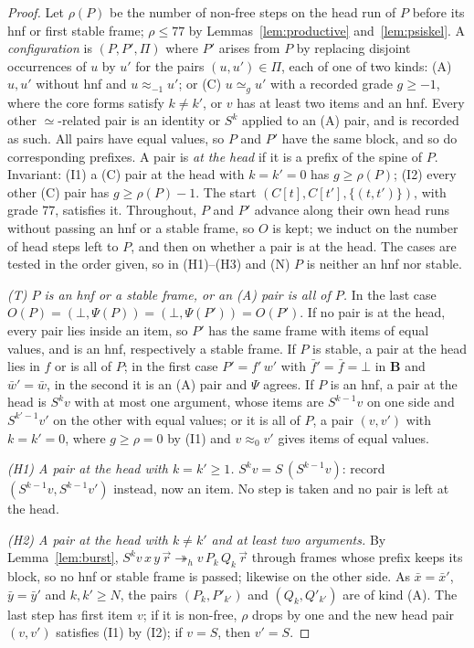 \documentclass[11pt]{amsart}
\theoremstyle{definition}
\newcommand{\B}{\mathbf B}
\newcommand{\hred}{\twoheadrightarrow_h}
\begin{document}
\begin{proof}
Let $\rho(P)$ be the number of non-free steps on the head run of $P$ before its hnf or first stable
frame; $\rho\le77$ by Lemmas~\ref{lem:productive} and~\ref{lem:psiskel}. A \emph{configuration} is
$(P,P',\Pi)$ where $P'$ arises from $P$ by replacing disjoint occurrences of $u$ by $u'$ for the pairs
$(u,u')\in\Pi$, each of one of two kinds: (A) $u,u'$ without hnf and $u\approx_{-1}u'$; or (C) $u\simeq_g
u'$ with a recorded grade $g\ge-1$, where the core forms satisfy $k\ne k'$, or $v$ has at least two
items and an hnf. Every other $\simeq$-related pair is an identity or $S^k$ applied to an (A) pair, and
is recorded as such. All pairs have equal values, so $P$ and $P'$ have the same block, and so do
corresponding prefixes. A pair is \emph{at the head} if it is a prefix of the spine of $P$. Invariant:
(I1) a (C) pair at the head with $k=k'=0$ has $g\ge\rho(P)$; (I2) every other (C) pair has
$g\ge\rho(P)-1$. The start $(C[t],C[t'],\{(t,t')\})$, with grade $77$, satisfies it. Throughout, $P$ and $P'$ advance along their own head runs without passing an hnf or a stable frame, so $O$ is kept;
we induct on the number of head steps left to $P$, and then on whether a pair is at the head. The cases are tested in the order given, so in
(H1)--(H3) and (N) $P$ is neither an hnf nor stable.

\emph{(T) $P$ is an hnf or a stable frame, or an (A) pair is all of $P$.} In the last case
$O(P)=(\bot,\Psi(P))=(\bot,\Psi(P'))=O(P')$. If no pair is at the head, every pair lies inside an
item, so $P'$ has the same frame with items of equal values, and is an hnf, respectively a stable
frame. If $P$ is stable, a pair at the head lies in $f$ or is all of $P$; in the first case
$P'=f'\,w'$ with $\bar f'=\bar f=\bot$ in $\B$ and $\bar w'=\bar w$, in the second it is an (A) pair and
$\Psi$ agrees. If $P$ is an hnf, a pair at the head is $S^k v$ with at most one argument, whose
items are $S^{k-1}v$ on one side and $S^{k'-1}v'$ on the other with equal values; or it is all of $P$, a pair $(v,v')$ with $k=k'=0$,
where $g\ge\rho=0$ by (I1) and $v\approx_0v'$ gives items of equal values.

\emph{(H1) A pair at the head with $k=k'\ge1$.} $S^kv=S\,(S^{k-1}v)$: record $(S^{k-1}v,S^{k-1}v')$
instead, now an item. No step is taken and no pair is left at the head.

\emph{(H2) A pair at the head with $k\ne k'$ and at least two arguments.} By Lemma~\ref{lem:burst},
$S^kv\,x\,y\,\vec r\hred v\,P_k\,Q_k\,\vec r$ through frames whose prefix keeps its block, so no hnf or
stable frame is passed; likewise on the other side. As $\bar x=\bar x'$, $\bar y=\bar y'$ and
$k,k'\ge N$, the pairs $(P_k,P'_{k'})$ and $(Q_k,Q'_{k'})$ are of kind (A). The last step has first
item $v$; if it is non-free, $\rho$ drops by one and the new head pair $(v,v')$ satisfies (I1) by
(I2); if $v=S$, then $v'=S$.


\end{proof}
\end{document}
